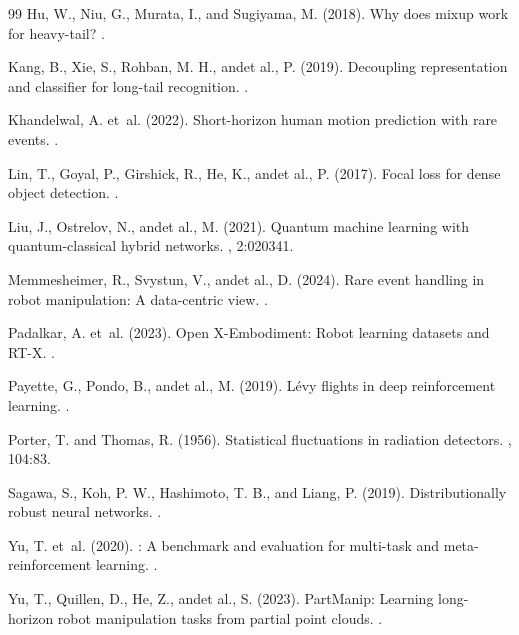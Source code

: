 \documentclass[10pt]{article}
\begin{document}
\begin{thebibliography}{99}
Hu, W., Niu, G., Murata, I., and Sugiyama, M. (2018).
\newblock Why does mixup work for heavy-tail?
.

Kang, B., Xie, S., Rohban, M. H., andet al., P. (2019).
\newblock Decoupling representation and classifier for long-tail recognition.
.

Khandelwal, A. et~al. (2022).
\newblock Short-horizon human motion prediction with rare events.
.

Lin, T., Goyal, P., Girshick, R., He, K., andet al., P. (2017).
\newblock Focal loss for dense object detection.
.

Liu, J., Ostrelov, N., andet al., M. (2021).
\newblock Quantum machine learning with quantum-classical hybrid networks.
, 2:020341.

Memmesheimer, R., Svystun, V., andet al., D. (2024).
\newblock Rare event handling in robot manipulation: A data-centric view.
.

Padalkar, A. et~al. (2023).
\newblock Open X-Embodiment: Robot learning datasets and {RT-X}.
.

Payette, G., Pondo, B., andet al., M. (2019).
\newblock L\'evy flights in deep reinforcement learning.
.

Porter, T. and Thomas, R. (1956).
\newblock Statistical fluctuations in radiation detectors.
, 104:83.

Sagawa, S., Koh, P. W., Hashimoto, T. B., and Liang, P. (2019).
\newblock Distributionally robust neural networks.
.

Yu, T. et~al. (2020).
: A benchmark and evaluation for multi-task and
  meta-reinforcement learning.
.

Yu, T., Quillen, D., He, Z., andet al., S. (2023).
\newblock PartManip: Learning long-horizon robot manipulation tasks from
  partial point clouds.
.


\end{thebibliography}
\end{document}

